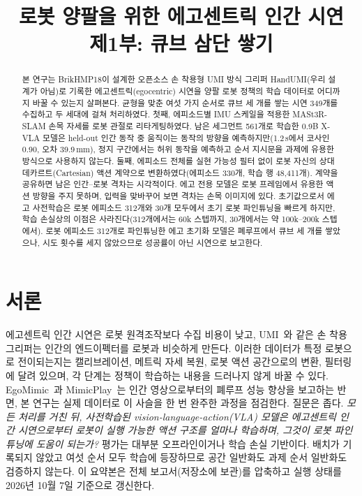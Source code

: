 \documentclass[conference,10pt]{IEEEtran}
\newcommand{\mm}{\,mm\xspace}
\begin{document}
\title{로봇 양팔을 위한 에고센트릭 인간 시연\\제1부: 큐브 삼단 쌓기}
\author{
}
\maketitle

\begin{abstract}
본 연구는 BrikHMP18이 설계한 오픈소스 손 착용형 UMI 방식 그리퍼 HandUMI(우리 설계가 아님)로 기록한 에고센트릭(egocentric) 시연을 양팔 로봇 정책의 학습 데이터로 어디까지 바꿀 수
있는지 살펴본다. 균형을 맞춘 여섯 가지 순서로 큐브 세 개를 쌓는 시연 349개를 수집하고 두 세대에 걸쳐 처리하였다. 첫째, 에피소드별
IMU 스케일을 적용한 MASt3R-SLAM 손목 자세를 로봇 관절로 리타게팅하였다. 남은 세그먼트 561개로 학습한 0.9B X-VLA 모델은 held-out
인간 동작 중 움직이는 동작의 방향을 예측하지만(1.2\,s에서 코사인 0.90, 오차 39.9\mm), 정지 구간에서는 허위 동작을 예측하고 순서
지시문을 과제에 유용한 방식으로 사용하지 않는다. 둘째, 에피소드 전체를 실현 가능성 필터 없이 로봇 자신의 상대 데카르트(Cartesian)
액션 계약으로 변환하였다(에피소드 330개, 학습 행 48{,}411개). 계약을 공유하면 남은 인간--로봇 격차는 시각적이다. 에고 전용 모델은
로봇 프레임에서 유용한 액션 방향을 주지 못하며, 입력을 맞바꾸어 보면 격차는 손목 이미지에 있다. 초기값으로서 에고 사전학습은 로봇
에피소드 312개와 30개 모두에서 초기 로봇 파인튜닝을 빠르게 하지만, 학습 손실상의 이점은 사라진다(312개에서는 60k 스텝까지, 30개에서는
약 100k--200k 스텝에서). 로봇 에피소드 312개로 파인튜닝한 에고 초기화 모델은 폐루프에서 큐브 세 개를 쌓았으나, 시도 횟수를 세지
않았으므로 성공률이 아닌 시연으로 보고한다.
\end{abstract}

\section{서론}
에고센트릭 인간 시연은 로봇 원격조작보다 수집 비용이 낮고, UMI~\cite{chi2024umi}와 같은 손 착용 그리퍼는 인간의 엔드이펙터를 로봇과
비슷하게 만든다. 이러한 데이터가 특정 로봇으로 전이되는지는 캘리브레이션, 메트릭 자세 복원, 로봇 액션 공간으로의 변환, 필터링에 달려
있으며, 각 단계는 정책이 학습하는 내용을 드러나지 않게 바꿀 수 있다. EgoMimic~\cite{kareer2024egomimic}과
MimicPlay~\cite{wang2023mimicplay}는 인간 영상으로부터의 폐루프 성능 향상을 보고하는 반면, 본 연구는 실제 데이터로 이 사슬을 한 번
완주한 과정을 점검한다. 질문은 좁다. \emph{모든 처리를 거친 뒤, 사전학습된 vision-language-action(VLA) 모델은 에고센트릭 인간
시연으로부터 로봇이 실행 가능한 액션 구조를 얼마나 학습하며, 그것이 로봇 파인튜닝에 도움이 되는가?} 평가는 대부분 오프라인이거나 학습
손실 기반이다. 배치가 기록되지 않았고 여섯 순서 모두 학습에 등장하므로 공간 일반화도 과제 순서 일반화도 검증하지 않는다. 이 요약본은
전체 보고서(저장소에 보관)를 압축하고 실행 상태를 2026년 10월 7일 기준으로 갱신한다.
\end{document}
